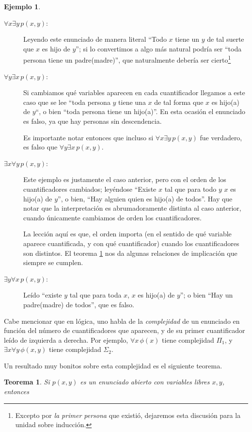 \documentclass{book}
\newtheorem{thm}{Teorema}[chapter]
\theoremstyle{definition}
\newtheorem{ejm}{Ejemplo}[chapter]
\begin{document}
\begin{ejm}
\begin{description}
	\item[$\forall x \exists y\, p(x,y)$:] Leyendo este enunciado de manera literal ``Todo $x$ tiene un $y$ de tal suerte que $x$ es hijo de $y$''; si lo convertimos a algo más natural podría ser ``toda persona tiene un padre(madre)'', que naturalmente debería ser cierto\footnote{Excepto por \emph{la primer persona} que existió, dejaremos esta discusión para la unidad sobre inducción.} %
	
	\item[$\forall y \exists x\, p(x,y)$:] Si cambiamos qué variables aparecen en cada cuantificador llegamos a este caso que se lee ``toda persona $y$ tiene una $x$ de tal forma que $x$ es hijo(a) de $y$``, o bien ``toda persona tiene un hijo(a)''.
	En esta ocasión el enunciado es falso, ya que hay personas sin descendencia.
	
	Es importante notar entonces que incluso si $\forall x \exists y\, p(x,y)$ fue verdadero, es falso que $\forall y \exists x\, p(x,y)$.
	
	\item[$\exists x \forall y \, p(x,y)$:]Este ejemplo es justamente el caso anterior, pero con el orden de los cuantificadores cambiados; leyéndose ``Existe $x$ tal que para todo $y$ $x$ es hijo(a) de $y$'', o bien, ``Hay alguien quien es hijo(a) de todos''.
	Hay que notar que la interpretación es abrumadoramente distinta al caso anterior, cuando únicamente cambiamos de orden los cuantificadores.
	
	La lección aquí es que, el orden importa (en el sentido de qué variable aparece cuantificada, y con qué cuantificador) cuando los cuantificadores son distintos.
	El teorema \ref{thm_implicacionesOrdenCuantificadores} nos da algunas relaciones de implicación que siempre se cumplen.
	
	\item[$\exists y \forall x\, p(x,y)$:] Leído ``existe $y$ tal que para toda $x$, $x$ es hijo(a) de $y$''; o bien ``Hay un padre(madre) de todos'', que es falso.
	\end{description}
\end{ejm}
Cabe mencionar que en lógica, uno habla de la \emph{complejidad} de un enunciado en función del número de cuantificadores que aparecen, y de su primer cuantificador leído de izquierda a derecha. 
Por ejemplo, $\forall x\,\phi(x)$ tiene complejidad $\Pi_1$, y $\exists x \forall y\, \phi(x,y)$ tiene complejidad $\Sigma_2$.

Un resultado muy bonitos sobre esta complejidad es el siguiente teorema. %
\begin{thm}
	Si $p(x,y)$ es un enunciado abierto con variables libres $x,y$, entonces %
	
	\label{thm_implicacionesOrdenCuantificadores}
\end{thm}
\end{document}
